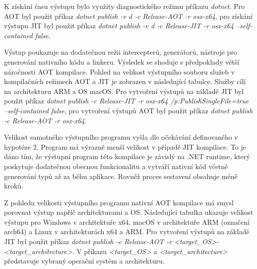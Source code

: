 K získání času výstupu bylo využity diagnostického režimu příkazu \emph{dotnet}. Pro AOT byl použit příkaz \emph{dotnet publish -v d -c Release-AOT -r osx-x64}, pro získání výstupu JIT byl použit příkaz \emph{dotnet publish -v d -c Release-JIT -r osx-x64 --self-contained false}.


Výstup poukazuje na dodatečnou režii intercepterů, generátorů, nástroje pro generování nativního kódu a linkeru. Výsledek se shoduje s předpoklady větší náročnosti AOT kompilace. Pohled na velikost výstupního souboru služeb v kompilačních režimech AOT a JIT je zobrazen v následující tabulce. Služby cílí na architekturu ARM a OS macOS. Pro vytvoření výstupů na základě JIT byl použit příkaz \emph{dotnet publish -c Release-JIT -r osx-x64 /p:PublishSingleFile=true --self-contained false}, pro vytvoření výstupů AOT byl použit příkaz \emph{dotnet publish -c Release-AOT -r osx-x64}.


Velikost samotného výstupního programu vyšla dle očekávání definovaného v hypotéze 2. Program má výrazně menší velikost v případě JIT kompilace. To je dáno tím, že výstupní program této kompilace je závislý na .NET runtime, který poskytuje dodatečnou obecnou funkcionalitu a vytváří nativní kód včetně generování typů až za běhu aplikace. Rovněž proces sestavení obsahuje méně kroků.

Z pohledu velikosti výstupního programu nativní AOT kompilace má smysl porovnat výstup napříč architekturami a OS. Následující tabulka ukazuje velikost výstupu pro Windows v architektuře x64, macOS v architektuře ARM (označení arch64) a Linux v architekturách x64 a ARM. Pro vytvoření výstupů na základě JIT byl použit příkaz \emph{dotnet publish -c Release-AOT -r <target\_OS>-<target\_architecture>}. V příkazu \emph{<target\_OS>} a \emph{<target\_architecture>} představuje vybraný operační systém a architekturu.

